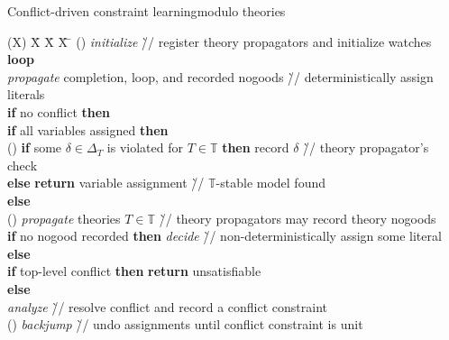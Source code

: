 \begin{frame}{Conflict-driven constraint learning}{modulo theories}
  \smallskip\scriptsize
  \setcounter{cddl}{8}
  \renewcommand{\thecddl}{\Alph{cddl}}
  \begin{tabbing}
   (X)   \= X  \= X  \= X  \= \kill%
   (\thecddl)\label{fig:cdcl:init}
         \> \textit{initialize} \` // register theory propagators and initialize watches \\
         \> \textbf{loop} \\
         \> \> \textit{propagate} completion, loop, and recorded nogoods
               \` // deterministically assign literals \\
         \> \> \textbf{if} no conflict \textbf{then} \\
         \> \> \> \textbf{if} all variables assigned \textbf{then} \\
   \setcounter{cddl}{2}%
   (\thecddl)\label{fig:cdcl:check}
         \> \> \> \> \textbf{if} some $\delta\in\Delta_T$ is violated for   $T\in\mathbb{T}$ \textbf{then} record $\delta$
                     \` // theory propagator's check \\
         \> \> \> \> \textbf{else} \textbf{return} variable assignment
                   \`// $\mathbb{T}$-stable model found \\
         \> \> \> \textbf{else} \\
   \setcounter{cddl}{15}%
   (\thecddl)\label{fig:cdcl:propagate}
         \> \> \> \> \textit{propagate} theories $T\in\mathbb{T}$
                     \`// theory propagators may record theory nogoods \\
         \> \> \> \> \textbf{if} no nogood recorded \textbf{then} \textit{decide}
                     \`// non-deterministically assign some literal \\
         \> \> \textbf{else} \\
         \> \> \> \textbf{if} top-level conflict \textbf{then} \textbf{return} unsatisfiable \\
         \> \> \> \textbf{else} \\
         \> \> \> \> \textit{analyze} \`// resolve conflict and record a conflict constraint \\
   \setcounter{cddl}{20}%
   (\thecddl)\label{fig:cdcl:undo}
         \> \> \> \> \textit{backjump} \`// undo assignments until conflict constraint is unit
 \end{tabbing}
\end{frame}
